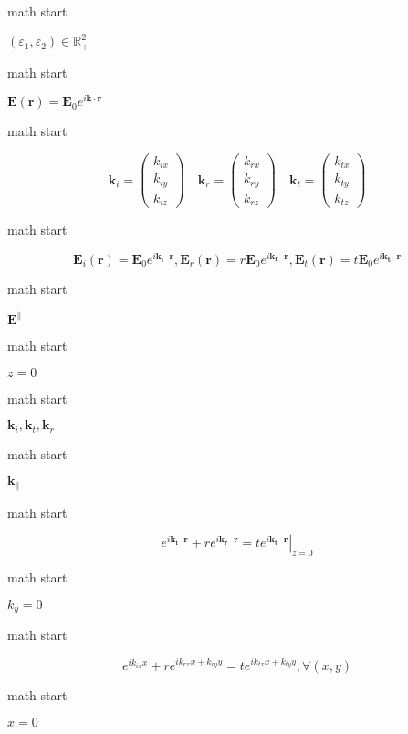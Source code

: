 math start

\(\left(\varepsilon_{1}, \varepsilon_{2}\right) \in \mathbb{R}_{+}^{2}\)

math start

\(\mathbf{E}(\mathbf{r})=\mathbf{E}_{0} e^{i \mathbf{k} \cdot \mathbf{r}}\)

math start

\[\mathbf{k}_{i}=\left(\begin{array}{l}
k_{i x} \\
k_{i y} \\
k_{i z}
\end{array}\right) \quad \mathbf{k}_{r}=\left(\begin{array}{l}
k_{r x} \\
k_{r y} \\
k_{r z}
\end{array}\right) \quad \mathbf{k}_{t}=\left(\begin{array}{l}
k_{t x} \\
k_{t y} \\
k_{t z}
\end{array}\right)\]

math start

\[\mathbf{E}_i(\mathbf{r})=\mathbf{E}_{0} e^{i \mathbf{k_i} \cdot \mathbf{r}},\mathbf{E}_r(\mathbf{r})=r\mathbf{E}_{0} e^{i \mathbf{k_r} \cdot \mathbf{r}},\mathbf{E}_t(\mathbf{r})=t\mathbf{E}_{0} e^{i \mathbf{k_t} \cdot \mathbf{r}}\]

math start

\(\mathbf{E}^\parallel\)

math start

\(z=0\)

math start

\(\mathbf{k}_i,\mathbf{k}_t,\mathbf{k}_r\)

math start

\(\mathbf{k}_\parallel\)

math start

\[\left.e^{i \mathbf{k_i} \cdot \mathbf{r}} + r e^{i \mathbf{k_r} \cdot \mathbf{r}}=t e^{i \mathbf{k_t} \cdot \mathbf{r}}\right|_{z=0}\]

math start

\(k_y=0\)

math start

\[e^{i {k_{ix}x}} + r e^{i{k_{rx}x+k_{ry}y}} = t e^{i{k_{tx}x+k_{ty}y}}, \forall (x,y)\]

math start

\(x=0\)

